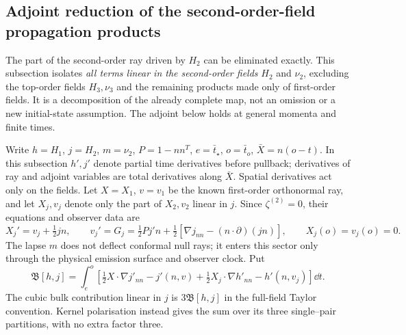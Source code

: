 \subsection{Adjoint reduction of the second-order-field propagation products}\label{sec:prop-adjoint}
The part of the second-order ray driven by $H_2$ can be eliminated exactly. This subsection isolates \emph{all terms linear in the second-order fields}
$H_2$ and $\nu_2$, excluding the top-order fields $H_3,\nu_3$ and the remaining products made
only of first-order fields. It is a decomposition of the already complete map, not an omission
or a new initial-state assumption. The adjoint below holds at general momenta and finite times.

Write $h=H_1$, $j=H_2$, $m=\nu_2$, $P=1-nn^T$, $e=\bar t_\star$, $o=\bar t_o$,
$\bar X=n(o-t)$. In this subsection $h',j'$ denote partial time derivatives before pullback;
derivatives of ray and adjoint variables are total derivatives along $\bar X$.
Spatial derivatives act only on the fields. Let $X=X_1$, $v=v_1$ be the known first-order
orthonormal ray, and let $X_j,v_j$ denote only the part of $X_2,v_2$ linear in $j$.
Since $\zeta^{(2)}=0$, their equations and observer data are
\begin{equation}\label{eq:prop-linear-ray}
 X_j'=v_j+\tfrac12jn,\qquad
 v_j'=G_j=\tfrac12Pj'n+\tfrac12[\nabla j_{nn}-(n\cdot\partial)(jn)],\qquad
 X_j(o)=v_j(o)=0.
\end{equation}
The lapse $m$ does not deflect conformal null rays; it enters this sector only through the
physical emission surface and observer clock. Put
\begin{equation}\label{eq:prop-bilinear}
 \mathfrak B[h,j]=\int_e^o\left[
 \tfrac12X\cdot\nabla j'_{nn}-j'(n,v)
 +\tfrac12X_j\cdot\nabla h'_{nn}-h'(n,v_j)\right]\dd t.
\end{equation}
The cubic bulk contribution linear in $j$ is $3\mathfrak B[h,j]$ in the full-field Taylor
convention. Kernel polarisation instead gives the sum over its three single--pair partitions,
with no extra factor three.

